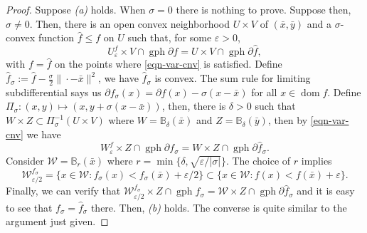 \documentclass[smallextended,envcountsect,envcountsame]{svjour3}
\newcommand{\gph}{\operatorname{gph}}
\newcommand{\dom}{\operatorname{dom}}
\renewcommand{\epsilon}{\varepsilon}
\newcommand{\1}{\mathds{1}}
\begin{document}
	\begin{proof}
		Suppose \emph{(a)} holds. When $\sigma = 0$ there is nothing to prove. Suppose then, $\sigma\neq 0$. Then, there is an open convex neighborhood $U\times V$ of $(\bar x,\bar y)$ and a $\sigma$-convex function $\hat f\leq f$ on $U$ such that, for some $\epsilon>0$, 
		\begin{equation}\label{eqn-var-cnv}
			U_\epsilon^f\times V\cap \gph \partial f = U\times V\cap \gph \partial \hat f,	
		\end{equation}
		with $f = \hat f$ on the points where \eqref{eqn-var-cnv} is satisfied. Define $\hat{f}_\sigma := \hat{f}-\frac{\sigma}{2}\|\cdot-\bar x\|^2$, we have $\hat{f}_\sigma$ is convex. The sum rule for limiting subdifferential says us $\partial f_\sigma(x) = \partial f(x) - \sigma(x-\bar x)$ for all $x\in \dom f$. Define $\Pi_\sigma\colon (x,y)\mapsto (x,y+\sigma(x-\bar x))$, then, there is $\delta>0$ such that $W\times Z\subset \Pi_\sigma^{-1}(U\times V)$ where $W = \mathbb{B}_{\delta}(\bar x)$ and $Z = \mathbb{B}_\delta(\bar y)$, then by \eqref{eqn-var-cnv} we have
		\begin{equation*}
			W_\epsilon^f\times Z\cap \gph \partial f_\sigma = W\times Z\cap \gph\partial \hat{f}_\sigma.
		\end{equation*}
		Consider $\mathcal{W} = \mathbb{B}_{r}(\bar x)$ where $r = \min\{\delta,\sqrt{\epsilon/|\sigma|}\}$. The choice of $r$ implies $$\mathcal{W}_{\epsilon/2}^{f_\sigma}=\{x\in \mathcal{W} : f_\sigma(x)<f_\sigma(\bar x) + \epsilon/2\}\subset \{x\in \mathcal{W} : f(x)<f(\bar x) + \epsilon\}.$$ 
		Finally, we can verify that $\mathcal{W}_{\epsilon/2}^{f_\sigma}\times Z\cap \gph f_\sigma = \mathcal{W}\times Z\cap \gph \partial \hat{f}_\sigma$ and it is easy to see that $f_\sigma = \hat{f}_\sigma$ there. Then, \emph{(b)} holds. The converse is quite similar to the argument just given.
	\end{proof}
	
\end{document}
